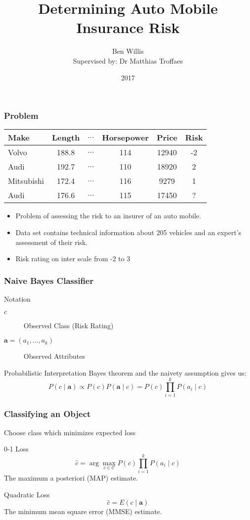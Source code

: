 \documentclass{beamer}
\title{Determining Auto Mobile Insurance Risk}
\author[Ben Willis]{Ben Willis \\ \scriptsize{ Supervised by: Dr Matthias Troffaes}}
\institute{Durham University}
\date{2017}
\begin{document}
 
\frame{\titlepage}

\begin{frame}
	\frametitle{Problem}
	\begin{center}
		\begin{tabular}{l c c c c|c}
			Make       & Length & $\dots$ & Horsepower & Price & Risk \\
			\hline
			Volvo      & 188.8  & $\dots$ & 114        & 12940 & -2   \\
			Audi       & 192.7  & $\dots$ & 110        & 18920 & 2    \\
			Mitsubishi & 172.4  & $\dots$ & 116        & 9279  & 1    \\
			Audi       & 176.6  & $\dots$ & 115        & 17450 & ?
		\end{tabular}
	\end{center}
	\begin{itemize}
		\item Problem of assessing the risk to an insurer of an auto mobile.
		\item Data set contains technical information about 205 vehicles and an expert's assessment of their risk.
		\item Risk rating on inter scale from -2 to 3
	\end{itemize}
\end{frame}

\begin{frame}
	\frametitle{Naive Bayes Classifier}
	\begin{block}{Notation}
		\begin{description}
			\item[$c$] Observed Class (Risk Rating)
			\item[$\mathbf{a} = (a_1,...,a_k)$] Observed Attributes
		\end{description}
	\end{block}
	\begin{block}{Probabilistic Interpretation}
		Bayes theorem and the naivety assumption gives us:
		\begin{equation}
			P(c \mid \mathbf{a}) \propto P(c)P(\mathbf{a} \mid c) = P(c)\prod_{i=1}^{k}P(a_i \mid c)
		\end{equation}
	\end{block}
\end{frame}

\begin{frame}
	\frametitle{Classifying an Object}
	Choose class which minimizes expected loss
	\begin{block}{0-1 Loss}
		\begin{equation}
			\hat c = \arg\max_{c \in \mathcal{C}} P(c)\prod_{i=1}^{k}P(a_i \mid c)
		\end{equation}
		The maximum a posteriori (MAP) estimate.
	\end{block}
	\begin{block}{Quadratic Loss}
		\begin{equation}
			\hat c = E(c \mid \mathbf{a})
		\end{equation}
		The minimum mean square error (MMSE) estimate.
	\end{block}
\end{frame}
\end{document}
